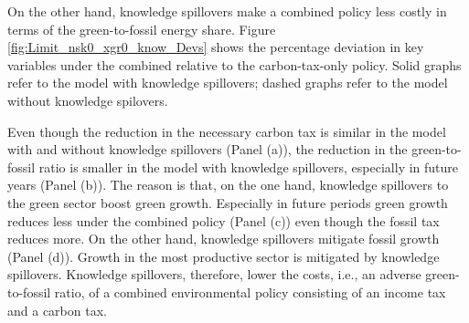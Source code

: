 On the other hand, knowledge spillovers make a combined policy less costly in terms of the green-to-fossil energy share.
Figure \ref{fig:Limit_nsk0_xgr0_know_Devs} shows the percentage deviation in key variables under the combined relative to the carbon-tax-only policy. Solid graphs refer to the model with knowledge spillovers; dashed graphs refer to the model without knowledge spilovers. 

Even though the reduction in the necessary carbon tax is similar in the model with and without knowledge spillovers (Panel (a)), the reduction in the green-to-fossil ratio is smaller in the model with knowledge spillovers, especially in future years (Panel (b)). The reason is that, on the one hand, knowledge spillovers to the green sector boost green growth. Especially in future periods green growth reduces less under the combined policy (Panel (c)) even though the fossil tax reduces more. On the other hand, knowledge spillovers mitigate fossil growth (Panel (d)).  Growth in the most productive sector is mitigated by knowledge spillovers.  Knowledge spillovers, therefore, lower the costs, i.e., an adverse green-to-fossil ratio, of a combined environmental policy consisting of an income tax and a carbon tax. 


 

